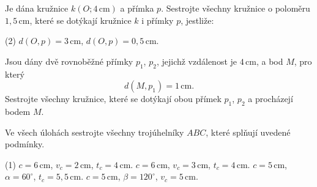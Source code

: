 \documentclass[12pt,a4paper]{article}
\begin{document}

\begin{exercise}

    Je dána kružnice $k(O;4\,\mathrm{cm})$ a přímka $p$.
    Sestrojte všechny kružnice o poloměru $1{,}5\,\mathrm{cm}$,
    které se dotýkají kružnice $k$ i přímky $p$, jestliže:

    \begin{tasks}(2)
        \task $d(O,p)=3\,\mathrm{cm}$,
        \task $d(O,p)=0{,}5\,\mathrm{cm}$.
    \end{tasks}

\end{exercise}



\begin{exercise}

    Jsou dány dvě rovnoběžné přímky $p_1$, $p_2$, jejichž vzdálenost je
    $4\,\mathrm{cm}$, a bod $M$, pro který
    \[
        d(M,p_1)=1\,\mathrm{cm}.
    \]
    Sestrojte všechny kružnice, které se dotýkají obou přímek
    $p_1$, $p_2$ a procházejí bodem $M$.

\end{exercise}



\begin{exercise}

    Ve všech úlohách sestrojte všechny trojúhelníky $ABC$, které splňují uvedené podmínky.

    \begin{tasks}(1)
        \task $c=6\,\mathrm{cm}$, $v_c=2\,\mathrm{cm}$, $t_c=4\,\mathrm{cm}$.
        \task $c=6\,\mathrm{cm}$, $v_c=3\,\mathrm{cm}$, $t_c=4\,\mathrm{cm}$.
        \task $c=5\,\mathrm{cm}$, $\alpha=60^\circ$, $t_c=5{,}5\,\mathrm{cm}$.
        \task $c=5\,\mathrm{cm}$, $\beta=120^\circ$, $v_c=5\,\mathrm{cm}$.
    \end{tasks}

\end{exercise}


\end{document}
